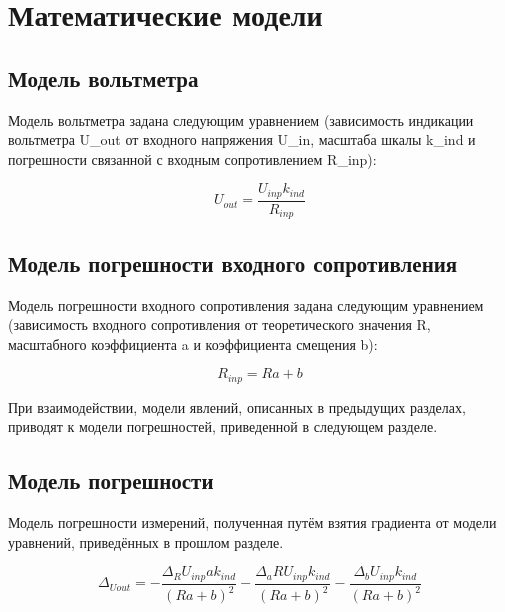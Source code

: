 \documentclass[12pt]{article}   %
\begin{document}
\clearpage





\section{Математические модели}

\subsection{Модель вольтметра}

Модель вольтметра задана следующим уравнением (зависимость индикации вольтметра U\_out от входного напряжения U\_in, масштаба шкалы k\_ind и погрешности связанной с входным сопротивлением R\_inp):

\begin{equation}
    U_{out} = \frac{U_{inp} k_{ind}}{R_{inp}}
\end{equation}


\subsection{Модель погрешности входного сопротивления}

Модель погрешности входного сопротивления задана следующим уравнением (зависимость входного сопротивления от теоретического значения R, масштабного коэффициента a и коэффициента смещения b):

\begin{equation}
    R_{inp} = R a + b
\end{equation}

При взаимодействии, модели явлений, описанных в предыдущих разделах, приводят к модели погрешностей, приведенной в следующем разделе.



\subsection{Модель погрешности}

Модель погрешности измерений, полученная путём взятия градиента от модели уравнений, приведённых в прошлом разделе.

\begin{equation}
    \Delta_{U out} = - \frac{\Delta_{R} U_{inp} a k_{ind}}{\left(R a + b\right)^{2}} - \frac{\Delta_{a} R U_{inp} k_{ind}}{\left(R a + b\right)^{2}} - \frac{\Delta_{b} U_{inp} k_{ind}}{\left(R a + b\right)^{2}}
\end{equation}
\end{document}
